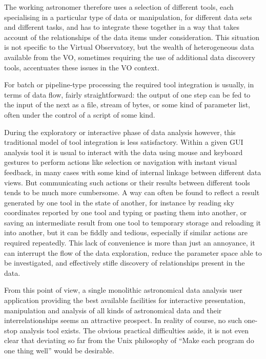 \documentclass[5p]{elsarticle}
\begin{document}
The working astronomer therefore uses a selection of different tools,
each specialising in a particular type of data or manipulation,
for different data sets and different tasks,
and has to integrate these together in a way that takes account of
the relationships of the data items under consideration.
This situation is not specific to the Virtual Observatory,
but the wealth of heterogeneous data available from the VO,
sometimes requiring the use of additional data discovery tools,
accentuates these issues in the VO context.

For batch or pipeline-type processing the required tool integration
is usually, in terms of data flow, fairly straightforward:
the output of one step can be fed to the input of the next as a file,
stream of bytes, or some kind of parameter list,
often under the control of a script of some kind.

During the exploratory or interactive phase of data analysis however,
this traditional model of tool integration is less satisfactory.
Within a given GUI analysis
tool it is usual to interact with the data using
mouse and keyboard gestures to perform actions like selection or
navigation with instant visual feedback, in many cases with some
kind of internal linkage between different data views.
But communicating such actions or their results between different
tools tends to be much more cumbersome.
A way can often be found to reflect a result generated by one tool
in the state of another, for instance by reading sky coordinates
reported by one tool and typing or pasting them into another,
or saving an intermediate result from one tool to temporary storage
and reloading it into another, but it can be fiddly and tedious,
especially if similar actions are required repeatedly.
This lack of convenience is more than just an annoyance, it can
interrupt the flow of the data exploration, reduce the parameter
space able to be investigated, and effectively stifle discovery
of relationships present in the data.


From this point of view, a single monolithic astronomical data analysis
user application providing the best available facilities for
interactive presentation, manipulation and analysis of all kinds of
astronomical data and their interrelationships seems an attractive prospect.
In reality of course, no such one-stop analysis tool exists.
The obvious practical difficulties aside, it is not even clear
that deviating so far from the Unix philosophy of
``Make each program do one thing well'' \citep{mcilroy1978}
would be desirable.
\end{document}
